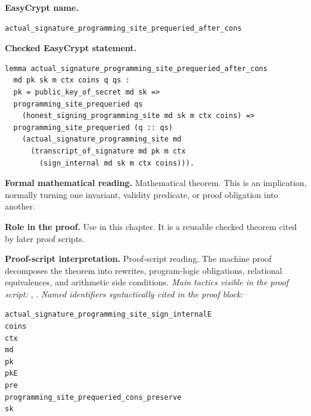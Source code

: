 \begin{formaltheorem}
\noindent\textbf{EasyCrypt name.}
\begin{lstlisting}[language=EasyCrypt,basicstyle=\ttfamily\scriptsize]
actual_signature_programming_site_prequeried_after_cons
\end{lstlisting}
\noindent\textbf{Checked EasyCrypt statement.}
\begin{lstlisting}[language=EasyCrypt,basicstyle=\ttfamily\scriptsize]
lemma actual_signature_programming_site_prequeried_after_cons
  md pk sk m ctx coins q qs :
  pk = public_key_of_secret md sk =>
  programming_site_prequeried qs
    (honest_signing_programming_site md sk m ctx coins) =>
  programming_site_prequeried (q :: qs)
    (actual_signature_programming_site md
      (transcript_of_signature md pk m ctx
        (sign_internal md sk m ctx coins))).
\end{lstlisting}
\noindent\textbf{Formal mathematical reading.}
Mathematical theorem. This is an implication, normally turning one invariant, validity predicate, or proof obligation into another.

\noindent\textbf{Role in the proof.}
Use in this chapter. It is a reusable checked theorem cited by later proof scripts.

\noindent\textbf{Proof-script interpretation.}
Proof-script reading. The machine proof decomposes the theorem into rewrites, program-logic obligations, relational equivalences, and arithmetic side conditions.
\emph{Main tactics visible in the proof script:} , .
\emph{Named identifiers syntactically cited in the proof block:}
\begin{lstlisting}[language=EasyCrypt,basicstyle=\ttfamily\scriptsize]
actual_signature_programming_site_sign_internalE
coins
ctx
md
pk
pkE
pre
programming_site_prequeried_cons_preserve
sk
\end{lstlisting}

\end{formaltheorem}

